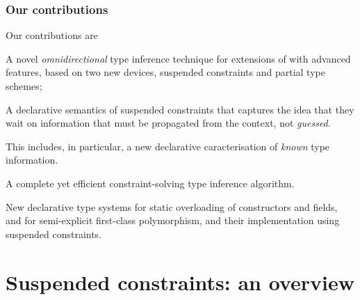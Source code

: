 \documentclass[acmsmall,screen,nonacm]{acmart}
\begin{document}

\subsubsection* {Our contributions}

Our contributions are
\begin{enumerate*}
\item
  A novel \emph{omnidirectional} type inference technique for
  extensions of \ML with advanced features, based on two new devices,
  suspended constraints and partial type schemes;

\item A declarative semantics of suspended constraints that captures the
  idea that they wait on information that must be propagated from the
  context, not \emph{guessed}.

  This includes, in particular, a new declarative caracterisation of
  \emph{known} type information.

\item
  A complete yet efficient constraint-solving type inference algorithm.

\item New declarative type systems for static overloading of constructors
  and fields, and for semi-explicit first-class polymorphism, and their
  implementation using suspended constraints.
\end{enumerate*}

\section{Suspended constraints: an overview}
\label{sec:constraints}
\end{document}
